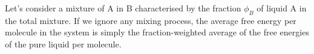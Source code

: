 \documentclass[a4paper, 11pt, normalem]{report}
\begin{document}
Let's consider a mixture of A in B characterised by the fraction $\phi_B$ of liquid A in the total mixture. 
If we ignore any mixing process, the average free energy per molecule in the system is simply the fraction-weighted average of the free energies of the pure liquid per molecule. 
\begin{figure}[H]
    \centering
\end{figure}
\end{document}
